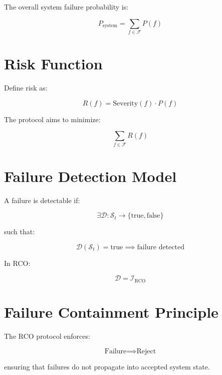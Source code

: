 The overall system failure probability is:

\begin{equation}
P_{\text{system}} = \sum_{f \in \mathcal{F}} P(f)
\end{equation}

\section{Risk Function}

Define risk as:

\begin{equation}
R(f) = \text{Severity}(f) \cdot P(f)
\end{equation}

The protocol aims to minimize:

\begin{equation}
\sum_{f \in \mathcal{F}} R(f)
\end{equation}

\section{Failure Detection Model}

A failure is detectable if:

\begin{equation}
\exists \mathcal{D}: \mathcal{S}_t \rightarrow \{\text{true}, \text{false}\}
\end{equation}

such that:

\begin{equation}
\mathcal{D}(\mathcal{S}_t) = \text{true} \implies \text{failure detected}
\end{equation}

In RCO:

\begin{equation}
\mathcal{D} = \mathcal{I}_{\text{RCO}}
\end{equation}

\section{Failure Containment Principle}

The RCO protocol enforces:

\begin{equation}
\text{Failure} \implies \text{Reject}
\end{equation}

ensuring that failures do not propagate into accepted system state.

